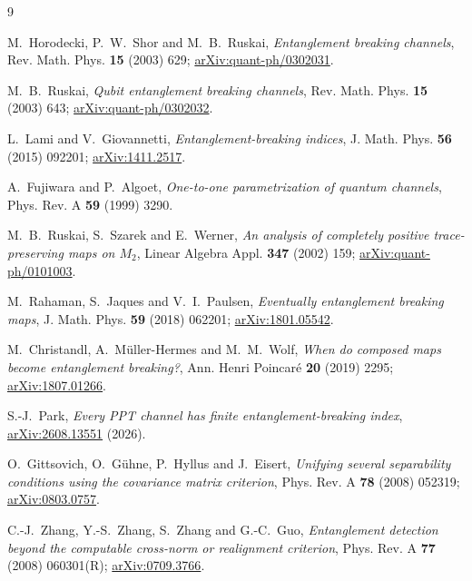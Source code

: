 \documentclass[11pt,a4paper]{article}
\theoremstyle{remark}
\begin{document}
\begin{thebibliography}{9}

 M.~Horodecki, P.~W.~Shor and M.~B.~Ruskai, \emph{Entanglement breaking channels}, Rev. Math. Phys. \textbf{15} (2003) 629; \href{https://arxiv.org/abs/quant-ph/0302031}{arXiv:quant-ph/0302031}.

 M.~B.~Ruskai, \emph{Qubit entanglement breaking channels}, Rev. Math. Phys. \textbf{15} (2003) 643; \href{https://arxiv.org/abs/quant-ph/0302032}{arXiv:quant-ph/0302032}.

 L.~Lami and V.~Giovannetti, \emph{Entanglement-breaking indices}, J. Math. Phys. \textbf{56} (2015) 092201; \href{https://arxiv.org/abs/1411.2517}{arXiv:1411.2517}.

 A.~Fujiwara and P.~Algoet, \emph{One-to-one parametrization of quantum channels}, Phys. Rev. A \textbf{59} (1999) 3290.

 M.~B.~Ruskai, S.~Szarek and E.~Werner, \emph{An analysis of completely positive trace-preserving maps on $M_2$}, Linear Algebra Appl. \textbf{347} (2002) 159; \href{https://arxiv.org/abs/quant-ph/0101003}{arXiv:quant-ph/0101003}.

 M.~Rahaman, S.~Jaques and V.~I.~Paulsen, \emph{Eventually entanglement breaking maps}, J. Math. Phys. \textbf{59} (2018) 062201; \href{https://arxiv.org/abs/1801.05542}{arXiv:1801.05542}.

 M.~Christandl, A.~M\"uller-Hermes and M.~M.~Wolf, \emph{When do composed maps become entanglement breaking?}, Ann. Henri Poincar\'e \textbf{20} (2019) 2295; \href{https://arxiv.org/abs/1807.01266}{arXiv:1807.01266}.

 S.-J.~Park, \emph{Every PPT channel has finite entanglement-breaking index}, \href{https://arxiv.org/abs/2608.13551}{arXiv:2608.13551} (2026).

 O.~Gittsovich, O.~G\"uhne, P.~Hyllus and J.~Eisert, \emph{Unifying several separability conditions using the covariance matrix criterion}, Phys. Rev. A \textbf{78} (2008) 052319; \href{https://arxiv.org/abs/0803.0757}{arXiv:0803.0757}.

 C.-J.~Zhang, Y.-S.~Zhang, S.~Zhang and G.-C.~Guo, \emph{Entanglement detection beyond the computable cross-norm or realignment criterion}, Phys. Rev. A \textbf{77} (2008) 060301(R); \href{https://arxiv.org/abs/0709.3766}{arXiv:0709.3766}.

\end{thebibliography}
\end{document}
